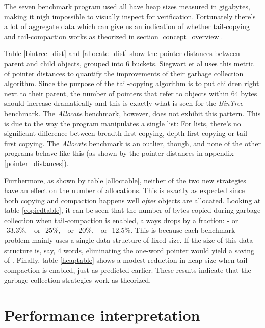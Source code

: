 \documentclass[a4paper,oneside]{memoir}
\begin{document}
The seven benchmark program used all have heap sizes measured in gigabytes,
making it nigh impossible to visually inspect for verification. Fortunately
there's a lot of aggregate data which can give us an indication of whether
tail-copying and tail-compaction works as theorized in section \ref{concept_overview}.

Table \ref{bintree_dist} and \ref{allocate_dist} show the pointer distances
between parent and child objects, grouped into 6 buckets. Siegwart et al uses
this metric of pointer distances to quantify the improvements of their
garbage collection algorithm.\cite{Siegwart:2006} Since the purpose of the tail-copying algorithm
is to put children right next to their parent, the number of pointers that refer
to objects within 64 bytes should increase dramatically and this is exactly what
is seen for the \emph{BinTree} benchmark. The \emph{Allocate} benchmark, however,
does not exhibit this pattern. This is due to the way the program manipulates
a single list: For lists, there's no significant difference between breadth-first
copying, depth-first copying or tail-first copying. The \emph{Allocate} benchmark
is an outlier, though, and none of the other programs behave like this (as
shown by the pointer distances in appendix \ref{pointer_distances}).

Furthermore, as shown by table \ref{alloctable}, neither of the two new strategies
have an effect on the number of allocations. This is exactly as expected since
both copying and compaction happens well \emph{after} objects are allocated.
Looking at table \ref{copiedtable}, it can be seen that the number of bytes copied
during garbage collection when tail-compaction is enabled, always drops by a
fraction: - or -33.3\%, - or -25\%,
- or -20\%, - or -12.5\%. This is because each
benchmark problem mainly uses a single data structure of fixed size. If the size
of this data structure is, say, 4 words, eliminating the one-word pointer would
yield a saving of . Finally, table \ref{heaptable} shows a modest
reduction in heap size when tail-compaction is enabled, just as predicted earlier.
These results indicate that the garbage collection strategies work as theorized.

\section{Performance interpretation}


\end{document}
